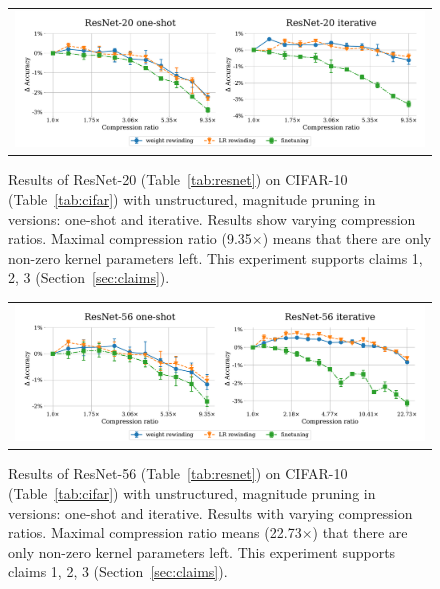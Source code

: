 \begin{figure}[H]
\centering
\setlength{\tabcolsep}{0pt}
\begin{tabular}{c}
\includegraphics[width=1.0\linewidth]{pics/Resnet20-1s-iterative.pdf}
\end{tabular}
\caption{Results of ResNet-20 (Table~\ref{tab:resnet}) on CIFAR-10 (Table~\ref{tab:cifar}) with unstructured, magnitude pruning in versions: one-shot and iterative. Results show varying compression ratios. Maximal compression ratio (9.35$\times$) means that there are only  non-zero kernel parameters left. This experiment supports claims 1, 2, 3 (Section~\ref{sec:claims}).}
\label{fig:resnet20-1}
\end{figure}

\begin{figure}[H]
\setlength{\tabcolsep}{0pt}
\centering
    \begin{tabular}{c}
      \includegraphics[width=1.0\linewidth]{pics/Resnet56-1s-iterative.pdf}
    \end{tabular}
\caption{Results of ResNet-56 (Table~\ref{tab:resnet}) on CIFAR-10 (Table~\ref{tab:cifar}) with unstructured, magnitude pruning in versions: one-shot and iterative. Results with varying compression ratios. Maximal compression ratio means (22.73$\times$) that there are only  non-zero kernel parameters left. This experiment supports claims 1, 2, 3 (Section~\ref{sec:claims}).}
\label{fig:resnet56}
\end{figure}

